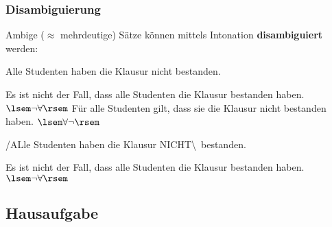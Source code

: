 
\begin{frame}
\frametitle{Disambiguierung}

Ambige ($\approx$ mehrdeutige) Sätze können mittels Intonation  \textbf{disambiguiert} werden: 

\begin{exe}
\ex  \label{exe:nicht}Alle Studenten haben die Klausur nicht bestanden.

	\begin{xlist}
	\ex Es ist nicht der Fall, dass alle Studenten die Klausur bestanden haben. \hfill $\lsem \neg \forall \rsem$
	\ex Für alle Studenten gilt, dass sie die Klausur nicht bestanden haben. \hfill $\lsem \forall \neg \rsem$
	\end{xlist}

\pause 

\ex /ALle Studenten haben die Klausur  NICHT\textbackslash\ bestanden.
	\begin{xlist}
	\ex Es ist nicht der Fall, dass alle Studenten die Klausur bestanden haben. \hfill $\lsem \neg \forall \rsem$
	\end{xlist}
\end{exe}


\end{frame}


\subsection{Hausaufgabe}


%	
%			
%			


